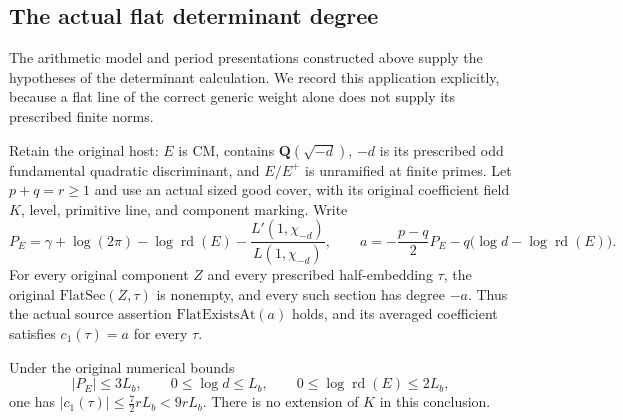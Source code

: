 \subsection{The actual flat determinant degree}
\label{sec:actual-flat-degree}

The arithmetic model and period presentations constructed above supply
the hypotheses of the determinant calculation.  We record this
application explicitly, because a flat line of the correct generic
weight alone does not supply its prescribed finite norms.

\begin{theorem}\label{thm:actual-flat-degree}
Retain the original host: $E$ is CM, contains
$\mathbf Q(\sqrt{-d})$, $-d$ is its prescribed odd fundamental
quadratic discriminant, and $E/E^+$ is unramified at finite primes.
Let $p+q=r\ge1$ and use an actual sized good cover\cite{current-construction-record}, with its original
coefficient field $K$, level, primitive line, and component marking.
Write
\[
 P_E=\gamma+\log(2\pi)-\log\operatorname{rd}(E)
          -\frac{L'(1,\chi_{-d})}{L(1,\chi_{-d})},\qquad
 a=-\frac{p-q}{2}P_E-q\bigl(\log d-\log\operatorname{rd}(E)\bigr).
\]
For every original component $Z$ and every prescribed half-embedding
$\tau$, the original $\mathrm{FlatSec}(Z,\tau)$ is nonempty, and
every such section has degree $-a$.  Thus the actual source
assertion $\mathrm{FlatExistsAt}(a)$ holds, and its averaged
coefficient satisfies $c_1(\tau)=a$ for every $\tau$.

Under the original numerical bounds
\[
 |P_E|\le3L_b,\qquad 0\le\log d\le L_b,\qquad
 0\le\log\operatorname{rd}(E)\le2L_b,
\]
one has $|c_1(\tau)|\le\tfrac72rL_b<9rL_b$.
There is no extension of $K$ in this conclusion.
\end{theorem}

